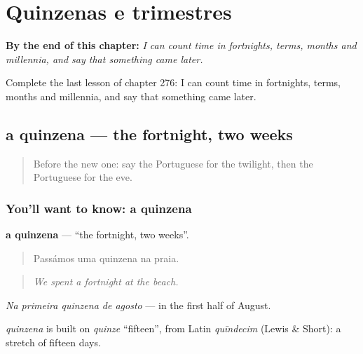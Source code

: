 
\chapter{Quinzenas e trimestres}
\label{ch:pt-quinzenas-e-trimestres}

\begin{chapteropening}
\textbf{By the end of this chapter:} \emph{I can count time in fortnights, terms, months and millennia, and say that something came later.}

Complete the last lesson of chapter 276: I can count time in fortnights, terms, months and millennia, and say that something came later.
\end{chapteropening}

\section[a quinzena]{a quinzena — the fortnight, two weeks}

\label{lesson:PT-C276-quinzena}



\begin{quote}
Before the new one: say the Portuguese for the twilight, then the Portuguese for the eve.
\end{quote}

\subsection*{You'll want to know: a quinzena}
\textbf{a quinzena} — \textquotedblleft{}the fortnight, two weeks\textquotedblright{}.

\begin{quote}
Passámos uma quinzena na praia.
\end{quote}

\begin{quote}
\emph{We spent a fortnight at the beach.}
\end{quote}

\emph{Na primeira quinzena de agosto} — in the first half of August.

\begin{cousinweb}
\emph{quinzena} is built on \emph{quinze} \textquotedblleft{}fifteen\textquotedblright{}, from Latin \emph{quīndecim} (Lewis \& Short): a stretch of fifteen days.
\end{cousinweb}

